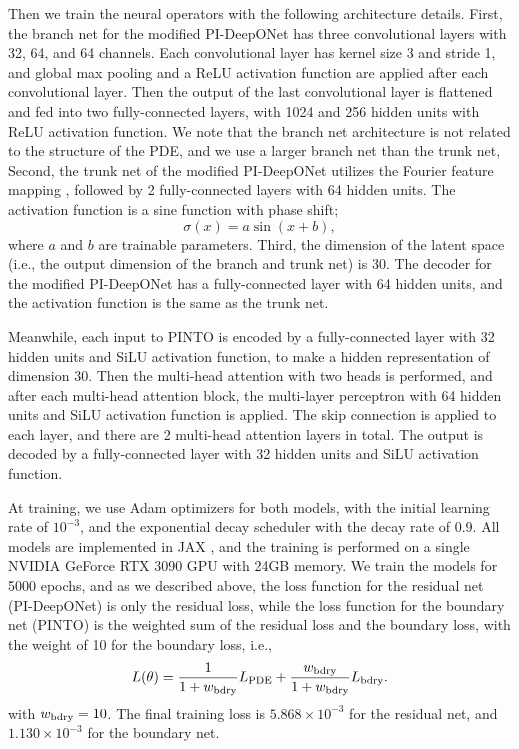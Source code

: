 Then we train the neural operators with the following architecture details.
First, the branch net for the modified PI-DeepONet has three convolutional layers with 32, 64, and 64 channels.
Each convolutional layer has kernel size 3 and stride 1, and global max pooling and a 
ReLU activation function are applied after each convolutional layer.
Then the output of the last convolutional layer is flattened and fed into two  
fully-connected layers, with 1024 and 256 hidden units with ReLU activation function.
We note that the branch net architecture is not related to the structure of the PDE,
and we use a larger branch net than the trunk net,
Second, the trunk net of the modified PI-DeepONet utilizes the Fourier feature mapping \cite{FFM},
followed by 2 fully-connected layers with 64 hidden units.
The activation function is a sine function \cite{activationsine} with phase shift;
\[ \sigma(x) = a \sin(x + b), \]
where $a$ and $b$ are trainable parameters.
Third, the dimension of the latent space (i.e., the output dimension of the branch and trunk net) is 30. The decoder for the modified PI-DeepONet has a fully-connected layer with
64 hidden units, and the activation function is the same as the trunk net.

Meanwhile, each input to PINTO is encoded by a fully-connected layer with 32 hidden units 
and SiLU activation function, to make a hidden representation of dimension 30.
Then the multi-head attention with two heads is performed, and after each multi-head attention 
block, the multi-layer perceptron with 64 hidden units and SiLU activation function is applied. 
The skip connection is applied to each layer, and there are 2 multi-head attention layers in total.
The output is decoded by a fully-connected layer with 32 hidden units and SiLU activation function.

At training, we use Adam optimizers for both models, with the initial learning rate of $10^{-3}$,
and the exponential decay scheduler with the decay rate of 0.9. 
All models are implemented in JAX \cite{jax}, and the training is performed on a single NVIDIA 
GeForce RTX 3090 GPU with 24GB memory.
We train the models for 5000 epochs, and as we described above, the loss function for the 
residual net (PI-DeepONet) is only the residual loss, while the loss function for the boundary net
(PINTO) is the weighted sum of the residual loss and the boundary loss, 
with the weight of 10 for the boundary loss, i.e.,
\[ L(\theta) = \frac{1}{1 + w_{\text{bdry}}} L_{\text{PDE}} +
\frac{w_{\text{bdry}}}{1 + w_{\text{bdry}}} L_{\text{bdry}}. \] 
with $w_{\text{bdry}} = 10$.
The final training loss is $5.868 \times 10^{-3}$ for the residual net, and $1.130 \times 10^{-3}$
for the boundary net.

